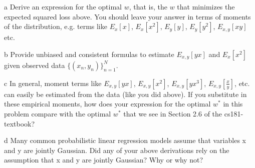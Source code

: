 \documentclass[expanded]{pset}
\begin{document}
\begin{parts}
  \begin{part}{a}
    Derive an expression for the optimal $w$, that is, the $w$
    that minimizes the expected squared loss above.  You should leave
    your answer in terms of moments of the distribution, e.g. terms
    like $E_x[x]$, $E_x[x^2]$, $E_y[y]$, $E_y[y^2]$, $E_{x,y}[xy]$
    etc.
  \end{part}

  \begin{part}{b}
    Provide unbiased and consistent formulas to estimate $E_{x, y}[yx]$
   and $E_x[x^2]$ given observed data $\{(x_n,y_n)\}_{n=1}^N$.
  \end{part}

  \begin{part}{c} In general, moment terms like $E_{x, y}[yx]$, $E_{x, y}[x^2]$,
    $E_{x, y}[yx^3]$, $E_{x, y}[\frac{x}{y}]$, etc. can easily be
    estimated from the data (like you did above).  If you substitute in
    these empirical moments, how does your expression for the optimal
    $w^*$ in this problem compare with the optimal $w^*$ that we see in
    Section 2.6 of the cs181-textbook?
  \end{part}

  \begin{part}{d}
    Many common probabilistic linear regression models assume that
    variables x and y are jointly Gaussian.  Did any of your above
    derivations rely on the assumption that x and y are jointly
    Gaussian?  Why or why not?
  \end{part}
\end{parts}
\end{document}
